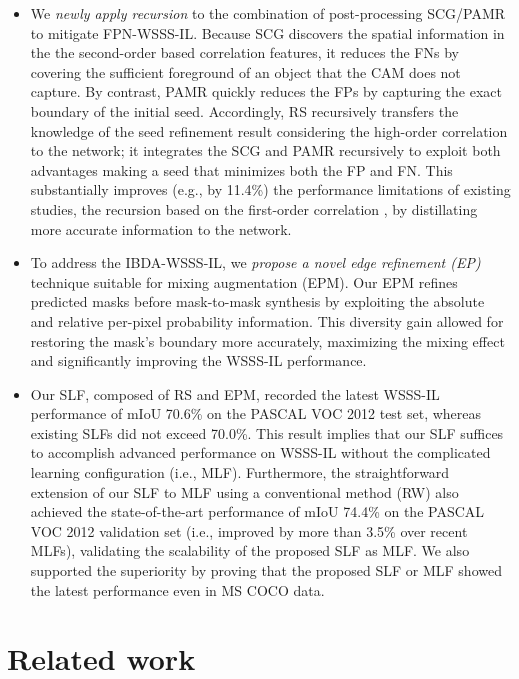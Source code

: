 \documentclass[11pt]{article}
\begin{document}
\begin{itemize}
     \item 
{We \textit{newly apply recursion} to the combination of post-processing SCG/PAMR to mitigate FPN-WSSS-IL.} Because SCG discovers the spatial information in the the second-order based correlation features, it reduces the FNs by covering the sufficient foreground of an object that the CAM does not capture. By contrast, PAMR quickly reduces the FPs by capturing the exact boundary of the initial seed. Accordingly, {RS recursively transfers the knowledge of the seed refinement result considering the high-order correlation to the network;} it integrates the SCG and PAMR recursively to exploit both advantages making a seed that minimizes both the FP and FN. {This substantially improves (e.g., by 11.4\%) the performance limitations of {existing studies, the recursion based on the first-order correlation \cite{wang2020self, zhang2021complementary, chen2022self}}, by distillating more accurate information to the network. } 
\item  
To address the IBDA-WSSS-IL, we \textit{propose a novel edge refinement (EP)} technique suitable for mixing augmentation (EPM). Our EPM refines predicted masks before mask-to-mask synthesis by exploiting the absolute and relative per-pixel probability information. This diversity gain allowed for restoring the mask's boundary more accurately, maximizing the mixing effect and significantly improving the WSSS-IL performance. 
    \item  
        Our SLF, composed of RS and EPM, recorded the latest WSSS-IL performance of mIoU 70.6\% {on the PASCAL VOC 2012 test set}, whereas existing SLFs did not exceed 70.0\%. This result implies that our SLF suffices to accomplish advanced performance on WSSS-IL without the complicated learning configuration (i.e., MLF). Furthermore, the straightforward extension of our SLF to MLF using {a conventional method (RW)} also achieved the state-of-the-art performance of mIoU 74.4\% {on the PASCAL VOC 2012 validation set} (i.e., improved by more than 3.5\% over recent MLFs), validating the scalability of the proposed SLF as MLF. We also supported the superiority by proving that the proposed SLF or MLF showed the latest performance even in MS COCO data. 
\end{itemize}

\section{Related work}
\label{section:related}
\end{document}
